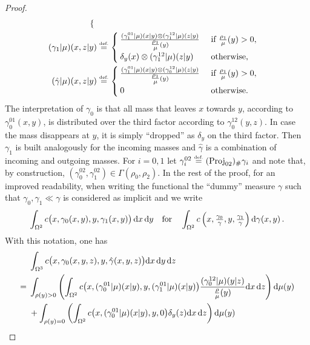 \begin{proof}
\begin{align*}
\begin{cases}
\end{cases} \\
{(\gamma_1|\mu)}(x,z|y) &\stackrel{\mbox{\upshape\tiny def.}}{=}
\begin{cases}
\frac{{(\gamma_1^{01}|\mu)}(x|y) \otimes {(\gamma_1^{12}|\mu)}(z|y)}{{\textstyle{\frac{\rho_1}{\mu}}}(y)} & \textnormal{ if } {\textstyle{\frac{\rho_1}{\mu}}}(y) >0, \\
\delta_{y}(x) \otimes {(\gamma_1^{12}|\mu)}(z|y) & \textnormal{ otherwise, }
\end{cases} \\
{(\hat{\gamma}|\mu)}(x,z|y) &\stackrel{\mbox{\upshape\tiny def.}}{=}  
\begin{cases}
\frac{{(\gamma_1^{01}|\mu)}(x|y) \otimes {(\gamma_0^{12}|\mu)}(z|y)}{{\textstyle{\frac{\rho_1}{\mu}}}(y)} & \textnormal{ if } {\textstyle{\frac{\rho_1}{\mu}}}(y) >0, \\
0 & \textnormal{ otherwise. }
\end{cases}
\end{align*}
The interpretation of $\gamma_0$ is that all mass that leaves $x$ towards $y$, according to $\gamma_0^{01}(x,y)$, is distributed over the third factor according to $\gamma_0^{12}(y,z)$. In case the mass disappears at $y$, it is simply ``dropped'' as $\delta_y$ on the third factor. Then $\gamma_1$ is built analogously for the incoming masses and $\hat{\gamma}$ is a combination of incoming and outgoing masses.
%
For $i=0,1$ let $\gamma_i^{02} \stackrel{\mbox{\upshape\tiny def.}}{=} (\operatorname{Proj}_{02})_{\#} \gamma_i$ and note that, by construction, $(\gamma_0^{02},\gamma_1^{02}) \in \Gamma(\rho_0, \rho_2)$.
In the rest of the proof, for an improved readability, when writing the functional the ``dummy'' measure $\gamma$ such that $\gamma_0, \gamma_1 \ll \gamma$ is considered as implicit and we write
	\begin{equation*}
	\label{remark : abuse of notation}
		\int_{\Omega^2} c\big(x,\gamma_0(x,y),y,\gamma_1(x,y)\big)\,\mathrm{d} x\,\mathrm{d} y
		\quad \text{for}\quad \int_{\Omega^2} c \left(x,\textstyle{\frac{ \gamma_0}{ \gamma}},y,\textstyle{\frac{ \gamma_1}{ \gamma}}\right) \mathrm{d} \gamma(x,y)\, .
	\end{equation*}
With this notation, one has
\begin{align*}
& \int_{\Omega^3} c\big(x,\gamma_0(x,y,z),y,\hat{\gamma}(x,y,z)\big) \d x\,\d y\,\d z \\
= {} & \int_{\rho(y)>0} \left( \int_{\Omega^2}
	c\big(x,\mudisint{\gamma_0^{01}}(x|y), y, \mudisint{\gamma_1^{01}}(x|y)\big)
	\frac{\mudisint{\gamma_0^{12}}(y|z)}{\mudens{\rho}(y)} \d x\,\d z \right) \d \mu(y) \\
& + \int_{\rho(y)=0} \left( \int_{\Omega^2}
	c\big(x,\mudisint{\gamma_0^{01}}(x|y),y,0\big) \delta_{y}(z) \d x\,\d z \right) \d \mu(y) \\

\end{align*}
\end{proof}

